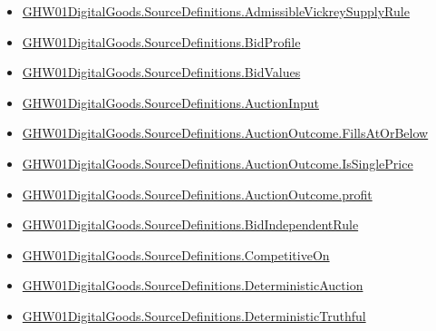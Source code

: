 \documentclass[10pt]{article}
\begin{document}
\begin{itemize}[leftmargin=1.2em]
\begin{itemize}[leftmargin=1.2em]
\item \hyperlink{paper-prerequisite-4e08a9e8320424b6}{GHW01\allowbreak{}Digital\allowbreak{}Goods.\allowbreak{}Source\allowbreak{}Definitions.\allowbreak{}Admissible\allowbreak{}Vickrey\allowbreak{}Supply\allowbreak{}Rule}
\item \hyperlink{paper-prerequisite-ac8769d0dccf04f4}{GHW01\allowbreak{}Digital\allowbreak{}Goods.\allowbreak{}Source\allowbreak{}Definitions.\allowbreak{}Bid\allowbreak{}Profile}
\item \hyperlink{paper-prerequisite-64512d0878f162c7}{GHW01\allowbreak{}Digital\allowbreak{}Goods.\allowbreak{}Source\allowbreak{}Definitions.\allowbreak{}Bid\allowbreak{}Values}
\item \hyperlink{paper-prerequisite-5788b9564a2c8f08}{GHW01\allowbreak{}Digital\allowbreak{}Goods.\allowbreak{}Source\allowbreak{}Definitions.\allowbreak{}Auction\allowbreak{}Input}
\item \hyperlink{paper-prerequisite-babf36338c3fb190}{GHW01\allowbreak{}Digital\allowbreak{}Goods.\allowbreak{}Source\allowbreak{}Definitions.\allowbreak{}Auction\allowbreak{}Outcome.\allowbreak{}Fills\allowbreak{}At\allowbreak{}Or\allowbreak{}Below}
\item \hyperlink{paper-prerequisite-6b7e7981d9081e03}{GHW01\allowbreak{}Digital\allowbreak{}Goods.\allowbreak{}Source\allowbreak{}Definitions.\allowbreak{}Auction\allowbreak{}Outcome.\allowbreak{}Is\allowbreak{}Single\allowbreak{}Price}
\item \hyperlink{paper-prerequisite-db537f75b83ffab9}{GHW01\allowbreak{}Digital\allowbreak{}Goods.\allowbreak{}Source\allowbreak{}Definitions.\allowbreak{}Auction\allowbreak{}Outcome.\allowbreak{}profit}
\item \hyperlink{paper-prerequisite-7c4e01ff6844d269}{GHW01\allowbreak{}Digital\allowbreak{}Goods.\allowbreak{}Source\allowbreak{}Definitions.\allowbreak{}Bid\allowbreak{}Independent\allowbreak{}Rule}
\item \hyperlink{paper-prerequisite-a38c75eea6979142}{GHW01\allowbreak{}Digital\allowbreak{}Goods.\allowbreak{}Source\allowbreak{}Definitions.\allowbreak{}Competitive\allowbreak{}On}
\item \hyperlink{paper-prerequisite-71190db14f40c12d}{GHW01\allowbreak{}Digital\allowbreak{}Goods.\allowbreak{}Source\allowbreak{}Definitions.\allowbreak{}Deterministic\allowbreak{}Auction}
\item \hyperlink{paper-prerequisite-6cf13e2e3e177e22}{GHW01\allowbreak{}Digital\allowbreak{}Goods.\allowbreak{}Source\allowbreak{}Definitions.\allowbreak{}Deterministic\allowbreak{}Truthful}

\end{itemize}
\end{itemize}
\end{document}
